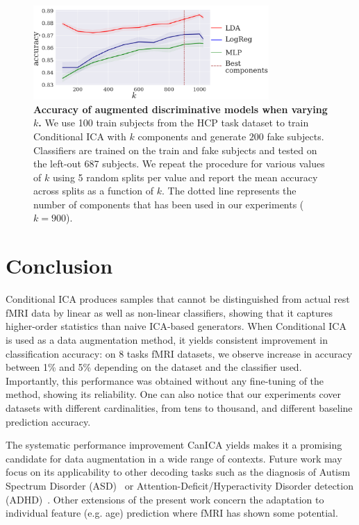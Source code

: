 \begin{figure}
  \centerline{\includegraphics[width=0.8\textwidth]{figures/condica/sensitivity.pdf}}
  \caption{\textbf{Accuracy of augmented discriminative models when
      varying $k$.} We use 100 train subjects from the HCP task dataset to train Conditional ICA with $k$ components and generate $200$ fake subjects.
    Classifiers are trained on the train and fake subjects and tested on the
    left-out 687 subjects. We repeat the procedure
    for various values of $k$ using 5 random splits per value and
    report the mean accuracy across splits as a function of $k$.
    The dotted line represents the number of components that has been
    used in our experiments ($k=900$).
  }
  \label{condica:sensitivity:fig}
\end{figure}






\section{Conclusion}
Conditional ICA produces samples that cannot be distinguished from actual rest fMRI data by linear as well as non-linear classifiers, showing that it captures higher-order statistics than naive ICA-based generators.
%
When Conditional ICA is used as a data augmentation method, it yields consistent
improvement in classification accuracy: on 8 tasks fMRI datasets, we observe
increase in accuracy between 1\% and 5\% depending on the dataset and the
classifier used.
Importantly, this performance was obtained without any fine-tuning of
the method, showing its reliability. One can also notice that our experiments cover datasets with different cardinalities, from tens to thousand, and different baseline prediction accuracy.

The systematic performance improvement CanICA yields
makes it a promising candidate for data augmentation in a wide range of
contexts. Future work may focus on its applicability to other decoding tasks
such as the diagnosis of Autism Spectrum Disorder
(ASD)~\cite{eslami2019asd,eslami2019auto,dvornek2017identifying} or
Attention-Deficit/Hyperactivity Disorder detection (ADHD)~\cite{mao2019spatio}. Other extensions of the present work concern the adaptation to
individual feature (e.g. age) prediction where
fMRI has shown some potential.
%
